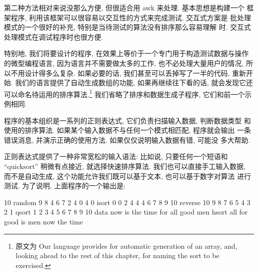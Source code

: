 第二种方法相对来说没那么方便, 但很适合用 awk 来处理. 基本思想是构建一个
框架程序, 利用该框架可以很容易以交互性的方式来完成测试. 交互式方案是
批处理模式的一个很好的补充, 特别是当待测试的算法没有排序那么容易理解
时. 交互式处理模式在调试程序时也很方便.

特别地, 我们将要设计的程序, 在效果上等价于一个专门用于构造测试数据与操作
的微型编程语言, 因为语言并不需要做太多的工作, 也不必处理大量用户的情况,
所以不用设计得多么复杂. 如果必要的话, 我们甚至可以丢掉写了一半的代码,
重新开始. 我们的语言提供了自动生成数组的功能, 如果再继续往下看的话, 
就会发现它还可以命名待运用的排序算法.\footnote{原文为 Our language provides
    for automatic generation of an array, and, looking ahead to the rest of
    this chapter, for naming the sort to be exercised.}
我们省略了排序和数据生成子程序, 它们和前一个示例相同.

程序的基本组织是一系列的正则表达式, 它们负责扫描输入数据, 判断数据类型
和使用的排序算法. 如果某个输入数据不与任何一个模式相匹配, 程序就会输出
一条错误消息, 并演示正确的使用方法. 如果仅仅说明输入数据有错, 可能没
多大帮助.

正则表达式提供了一种非常宽松的输入语法: 比如说, 只要任何一个短语和
``quicksort''
稍微有点接近, 就选择快速排序算法. 我们也可以直接手工输入数据, 
而不是自动生成, 这个功能允许我们既可以基于文本, 也可以基于数字对算法
进行测试. 为了说明, 上面程序的一个输出是:
\begin{shell}
    10 random 
     9 8 4 6 7 2 4 0 4 0
    isort 
     0 0 2 4 4 4 6 7 8 9
    10 reverse 
     10 9 8 7 6 5 4 3 2 1
    qsort
     1 2 3 4 5 6 7 8 9 10 
    data now is the time for all good men
    hsort
     all for good is men now the time
\end{shell}

